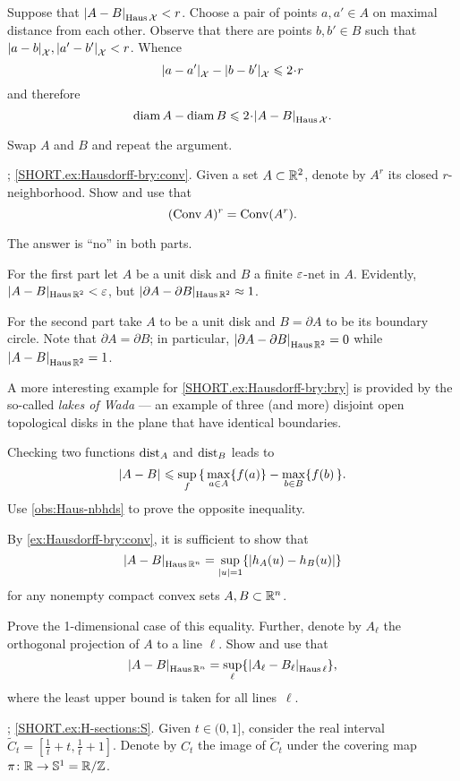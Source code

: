 \setcounter{eqtn}{0}

Suppose that $\dist{A}{B}{\Haus\spc{X}}<r$.
Choose a pair of points $a,a'\in A$ on maximal distance from each other.
Observe that there are points $b,b'\in B$ such that 
$\dist{a}{b}{\spc{X}},\dist{a'}{b'}{\spc{X}}<r$.
Whence 
\[\dist{a}{a'}{\spc{X}}-\dist{b}{b'}{\spc{X}}\le 2\cdot r\]
and therefore
\[\diam A-\diam B\le 2\cdot\dist{A}{B}{\Haus\spc{X}}.\]

Swap $A$ and $B$ and repeat the argument.


\parbf{\ref{ex:Hausdorff-bry}}; \ref{SHORT.ex:Hausdorff-bry:conv}.
Given a set $A\z\subset \RR^2$, denote by $A^r$ its closed $r$-neighborhood.
Show and use that 
\[(\mathop{\rm Conv}\nolimits A)^r=\mathop{\rm Conv}\nolimits(A^r).\]

The answer is ``no'' in both parts.

For the first part let $A$ be a unit disk and $B$ a finite $\varepsilon$-net in $A$.
Evidently, $|A-B|_{\Haus\RR^2}\z<\eps$, 
but
$|\partial A-\partial B|_{\operatorname{\rm Haus}\nolimits\mathbb{R}^2}\approx 1$.

For the second part take $A$ to be a unit disk and $B=\partial A$ to be its boundary circle.
Note that $\partial A=\partial B$; in particular, $\dist{\partial A}{\partial B}{\Haus\RR^2}=0$ while $\dist{ A}{B}{\Haus\RR^2}=1$.

A more interesting example for \ref{SHORT.ex:Hausdorff-bry:bry} is provided by the so-called \textit{lakes of Wada} --- an example of three (and more) disjoint open topological disks in the plane that have identical boundaries.

Checking two functions $\mathrm{dist}_A$ and $\mathrm{dist}_B$ leads to 
\[\dist{A}{B}{}\le\sup_f\, \{\,\max_{a\in A}\{f(a)\}-\max_{b\in B}\{f(b)\,\}.\]
Use \ref{obs:Haus-nbhds} to prove the opposite inequality.

 By \ref{ex:Hausdorff-bry:conv}, it is sufficient to show that  
\[\dist{A}{B}{\Haus\RR^n}= \sup_{|u|=1}\{|h_A(u)-h_B(u)|\}\]
for any nonempty compact convex sets $A,B\z\subset \RR^n$.

Prove the 1-dimensional case of this equality.
Further, denote by $A_\ell$ the orthogonal projection of $A$ to a line $\ell$.
Show and use that
\[\dist{A}{B}{\Haus\RR^n}=\sup_\ell\{\dist{A_\ell}{B_\ell}{\Haus\ell}\},\]
where the least upper bound is taken for all lines~$\ell$.

\parbf{\ref{ex:H-sections}};
\ref{SHORT.ex:H-sections:S}.
Given $t\in (0,1]$, consider the real interval $\tilde C_t=[\tfrac 1t+t, \tfrac 1t+1]$.
Denote by $C_t$ the image of $\tilde C_t$ under the covering map $\pi\:\RR\to \mathbb{S}^1\z=\RR/\ZZ$.

